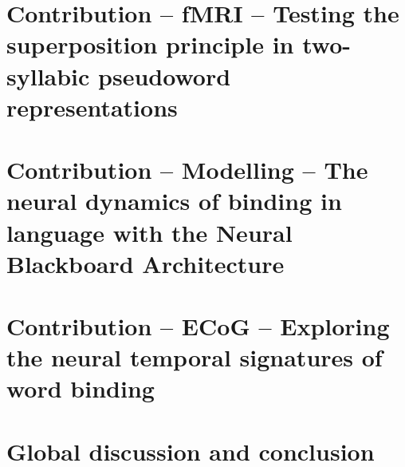 \documentclass[twoside, justified, notoc, nobib, 
	nohyper]{tufte-book}
\begin{document}
\part{Contribution -- fMRI -- Testing the superposition principle in two-syllabic pseudoword representations}
\cleardoublepage

\FloatBarrier

\FloatBarrier

\FloatBarrier

\FloatBarrier

\part{Contribution -- Modelling -- The neural dynamics of binding in language with the Neural Blackboard Architecture}
\cleardoublepage
% 
% 
% 
% 


\part{Contribution -- ECoG -- Exploring the neural temporal signatures of word binding}
\cleardoublepage
% 
% 
% 
% 


\part{Global discussion and conclusion}
\cleardoublepage
%
%
\cleardoublepage


\backmatter 



\clearpage
%
\end{document}
